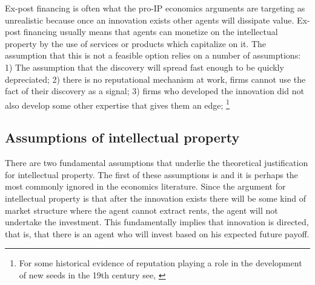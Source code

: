 \documentclass[12pt]{report}
\numberwithin{equation}{section}
\begin{document}
Ex-post financing is often what the pro-IP economics arguments are targeting as unrealistic because once an innovation exists other agents will dissipate value. Ex-post financing usually means that agents can monetize on the intellectual property by the use of services or products which capitalize on it. The assumption that this is not a feasible option relies on a number of assumptions: 1) The assumption that the discovery will spread fast enough to be quickly depreciated; 2) there is no reputational mechanism at work, firms cannot use the fact of their discovery as a signal; 3) firms who developed the innovation did not also develop some other expertise that gives them an edge; \footnote{For some historical evidence of reputation playing a role in the development of new seeds in the 19th century see, \cite{charnley2013seeds}}






\subsection{Assumptions of intellectual property}


There are two fundamental assumptions that underlie the theoretical justification for intellectual property. The first of these assumptions is  and it is perhaps the most commonly ignored in the economics literature. Since the argument for intellectual property is that after the innovation exists there will be some kind of market structure where the agent cannot extract rents, the agent will not undertake the investment. This fundamentally implies that innovation is directed, that is, that there is an agent who will invest based on his expected future payoff.
\end{document}
